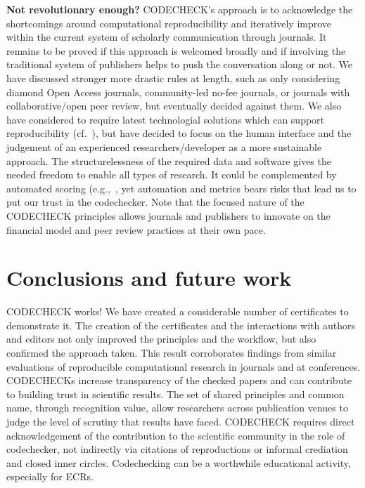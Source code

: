\documentclass[12pt]{article}
\begin{document}
\textbf{Not revolutionary enough?}
CODECHECK's approach is to acknowledge the shortcomings around 
computational reproducibility and iteratively improve within the current
system of scholarly communication through journals.
It remains to be proved if this approach is welcomed broadly and if 
involving the traditional system of publishers helps to push the 
conversation along or not.
We have discussed stronger more drastic rules at length, such as only 
considering diamond Open Access journals, community-led no-fee journals,
or journals with collaborative/open peer review, but eventually decided
against them.
We also have considered to require latest technologial solutions which can
support reproducibility (cf.~\cite{konkol_publishing_2020}), but have 
decided to focus on the human interface and the judgement of an experienced
researchers/developer as a more sustainable approach.
The structurelessness of the required data and software gives the needed
freedom to enable all types of research. It could be complemented by
automated scoring (e.g.,~\cite{menke_rigor_2020}, yet automation and 
metrics bears risks that lead us to put our trust in the codechecker.
Note that the focused nature of the CODECHECK principles allows journals
and publishers to innovate on the financial model and peer review practices
at their own pace.

\section*{Conclusions and future work}\label{future-work-and-conclusions}

CODECHECK works!
We have created a considerable number of certificates to demonstrate it.
The creation of the certificates and the interactions with authors and
editors not only improved the principles and the workflow, but also
confirmed the approach taken. This result corroborates findings from
similar evaluations of reproducible computational research in journals and
at conferences.
CODECHECKs increase transparency of the checked papers and can contribute
to building trust in scientific results.
The set of 
shared principles and common name, through recognition value,
allow researchers
across publication venues to judge the level of scrutiny that results have
faced. CODECHECK requires direct acknowledgement of the contribution to the
scientific community in the role of codechecker, not indirectly via citations 
of reproductions or informal crediation and closed inner circles.
Codechecking can be a worthwhile educational activity, especially for
ECRs.
\end{document}
